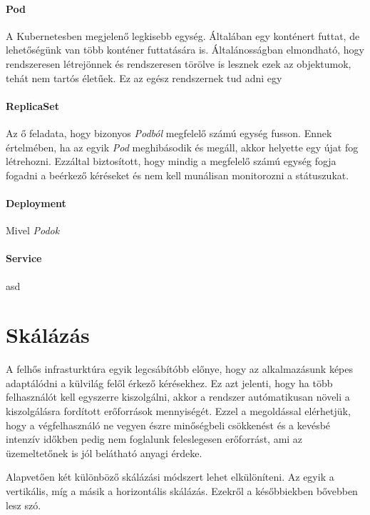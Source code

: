 \paragraph{Pod}
A Kubernetesben megjelenő legkisebb egység. Általában egy konténert futtat, de lehetőségünk van több konténer futtatására is. Általánosságban elmondható, hogy rendszeresen létrejönnek és rendszeresen törölve is lesznek ezek az objektumok, tehát nem tartós életűek. Ez az egész rendszernek tud adni egy 

\paragraph{ReplicaSet} 
Az ő feladata, hogy bizonyos \textit{Podból} megfelelő számú egység fusson. Ennek értelmében, ha az egyik \textit{Pod} meghibásodik és megáll, akkor helyette egy újat fog létrehozni. Ezzáltal biztosított, hogy mindig a megfelelő számú egység fogja fogadni a beérkező kéréseket és nem kell munálisan monitorozni a státuszukat.

\paragraph{Deployment}
Mivel \textit{Podok} 

\paragraph{Service}
asd

\section{Skálázás}
A felhős infrasturktúra egyik legcsábítóbb előnye, hogy az alkalmazásunk képes adaptálódni a külvilág felől érkező kérésekhez. Ez azt jelenti, hogy ha több felhasználót kell egyszerre kiszolgálni, akkor a rendszer autómatikusan növeli a kiszolgálásra fordított erőforrások mennyiségét. Ezzel a megoldással elérhetjük, hogy a végfelhasználó ne vegyen észre minőségbeli csökkenést és a kevésbé intenzív időkben pedig nem foglalunk feleslegesen erőforrást, ami az üzemeltetőnek is jól belátható anyagi érdeke.
 
Alapvetően két különböző skálázási módszert lehet elkülöníteni. Az egyik a vertikális, míg a másik a horizontális skálázás. Ezekről a későbbiekben bővebben lesz szó. 

